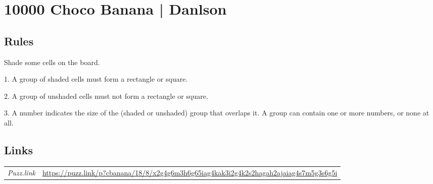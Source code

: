 \section{10000 Choco Banana | {\normalfont Danlson}}
\label{sec:53-10000-choco-banana-danlson}

\subsection*{Rules}
\begin{markdown}
Shade some cells on the board.

1. A group of shaded cells must form a rectangle or square.

2. A group of unshaded cells must not form a rectangle or square.

3. A number indicates the size of the (shaded or unshaded) group that overlaps it. A group can contain one or more numbers, or none at all.
\end{markdown}
\subsection*{Links}
\begin{tabularx}{\textwidth}{l X}
\emph{Puzz.link} & \url{https://puzz.link/p?cbanana/18/8/x2g4g6m3h6g65iag4kak3i2g4k2s2hagah2ajaiag4s7m5g3s6g5i} \\
\end{tabularx}
\pagebreak
